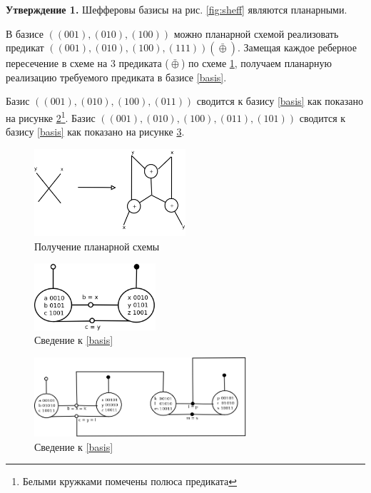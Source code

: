 \documentclass[12pt]{article}
\begin{document}
\textbf{Утверждение 1.} Шефферовы базисы на рис. \ref{fig:sheff} являются планарными.

В базисе $((001), (010), (100))$ \label{basis} можно планарной схемой реализовать предикат 
$((001), (010), (100), (111)) (\bar{\oplus})$. Замещая каждое реберное пересечение в схеме на 
3 предиката ($\bar{\oplus}$) по схеме \ref{fig:xor}, получаем планарную реализацию требуемого предиката
в базисе \ref{basis}.

Базис $((001), (010), (100), (011))$ сводится к базису \ref{basis} как показано на рисунке 
\ref{fig:scheff3_4}\footnote{Белыми кружками помечены полюса предиката}.
Базис $((001), (010), (100), (011), (101))$ сводится к базису \ref{basis} как показано на рисунке \ref{fig:scheff3_5}. 

\begin{figure}[htb]
\centering
\includegraphics[width=0.5\textwidth]{intersection.png}
\caption{Получение планарной схемы}
\label{fig:xor}
\end{figure}


\begin{figure}[htb]
\centering
\includegraphics[width=0.4\textwidth]{scheff4.png}
\caption{Сведение к \ref{basis}}
\label{fig:scheff3_4}
\end{figure}


\begin{figure}[htb]
\centering
\includegraphics[width=0.7\textwidth]{scheff5.png}
\caption{Сведение к \ref{basis}}
\label{fig:scheff3_5}
\end{figure}
\end{document}

